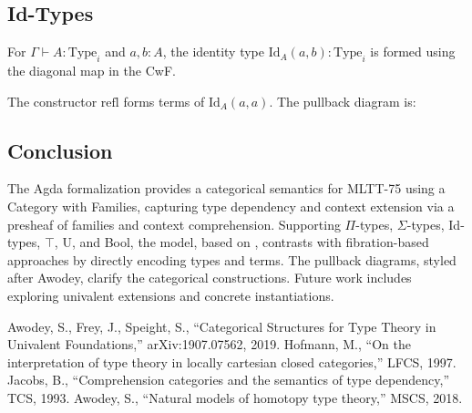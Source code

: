 \documentclass{article}
\begin{document}

\newpage
\subsection{Id-Types}
For $\Gamma \vdash A : \text{Type}_i$ and $a, b : A$, the identity type $\text{Id}_A(a, b) : \text{Type}_i$ is formed using the diagonal map in the CwF.

The constructor $\text{refl}$ forms terms of $\text{Id}_A(a, a)$. The pullback diagram is:


\subsection{Conclusion}
The Agda formalization provides a categorical semantics for MLTT-75 using a Category with Families, capturing type dependency and context extension via a presheaf of families and context comprehension. Supporting $\Pi$-types, $\Sigma$-types, Id-types, $\top$, U, and Bool, the model, based on \cite{awodey2019}, contrasts with fibration-based approaches by directly encoding types and terms. The pullback diagrams, styled after Awodey, clarify the categorical constructions. Future work includes exploring univalent extensions and concrete instantiations.

\begin{thebibliography}{9}
Awodey, S., Frey, J., Speight, S., ``Categorical Structures for Type Theory in Univalent Foundations,'' arXiv:1907.07562, 2019.
Hofmann, M., ``On the interpretation of type theory in locally cartesian closed categories,'' LFCS, 1997.
Jacobs, B., ``Comprehension categories and the semantics of type dependency,'' TCS, 1993.
Awodey, S., ``Natural models of homotopy type theory,'' MSCS, 2018.
\end{thebibliography}
\end{document}

